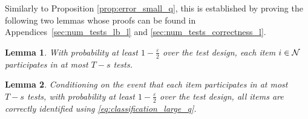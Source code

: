 \documentclass[onecolumn,letterpaper]{IEEEtran}
\newtheorem{lemma}{Lemma}
\newcommand{\cN}{{\cal N}}
\newcommand{\mo}{{s}}
\begin{document}
Similarly to Proposition \ref{prop:error_small_q}, this is established by proving the following two lemmas whose proofs can be found in Appendices~\ref{sec:num_tests_lb_l} and \ref{sec:num_tests_correctness_l}.
\begin{lemma} \label{lem:num_tests_lb_l}
With probability at least $1-\frac{\varepsilon}{2}$ over the test design, each item $i \in \cN$ participates in at most $T-\mo$ tests.
\end{lemma}
\begin{lemma}
\label{lem:num_tests_correctness_l}
Conditioning on the event that each item participates in at most $T-\mo$ tests, with probability at least $1-\frac{\varepsilon}{2}$ over the test design, all items are correctly identified using \eqref{eq:classification_large_q}.
\end{lemma}
\end{document}
